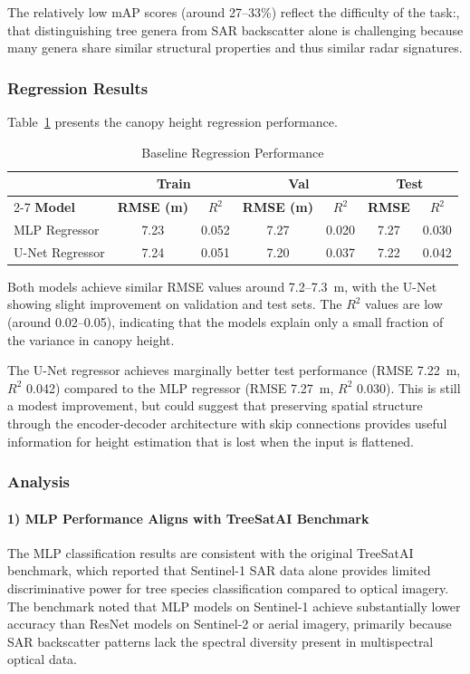 The relatively low mAP scores (around 27--33\%) reflect the difficulty of the task:, that distinguishing tree genera from SAR backscatter alone is challenging because many genera share similar structural properties and thus similar radar signatures.

\subsubsection{Regression Results}

Table~\ref{tab:baseline_regression} presents the canopy height regression performance.

\begin{table}[htbp]
\centering
\caption{Baseline Regression Performance}
\label{tab:baseline_regression}
\begin{tabular}{l|cc|cc|cc}
\hline
 & \multicolumn{2}{c|}{\textbf{Train}} & \multicolumn{2}{c|}{\textbf{Val}} & \multicolumn{2}{c}{\textbf{Test}} \\
\cline{2-7}
\textbf{Model} & \textbf{RMSE (m)} & \textbf{$R^2$} & \textbf{RMSE (m)} & \textbf{$R^2$} & \textbf{RMSE} & \textbf{$R^2$} \\
\hline
MLP Regressor & 7.23 & 0.052 & 7.27 & 0.020 & 7.27 & 0.030 \\
U-Net Regressor & 7.24 & 0.051 & 7.20 & 0.037 & 7.22 & 0.042 \\
\hline
\end{tabular}
\end{table}

Both models achieve similar RMSE values around 7.2--7.3~m, with the U-Net showing slight improvement on validation and test sets. The $R^2$ values are low (around 0.02--0.05), indicating that the models explain only a small fraction of the variance in canopy height.

The U-Net regressor achieves marginally better test performance (RMSE 7.22~m, $R^2$ 0.042) compared to the MLP regressor (RMSE 7.27~m, $R^2$ 0.030). This is still a modest improvement, but could suggest that preserving spatial structure through the encoder-decoder architecture with skip connections provides useful information for height estimation that is lost when the input is flattened.

\subsubsection{Analysis}

\paragraph{1) MLP Performance Aligns with TreeSatAI Benchmark} The MLP classification results are consistent with the original TreeSatAI benchmark, which reported that Sentinel-1 SAR data alone provides limited discriminative power for tree species classification compared to optical imagery. The benchmark noted that MLP models on Sentinel-1 achieve substantially lower accuracy than ResNet models on Sentinel-2 or aerial imagery, primarily because SAR backscatter patterns lack the spectral diversity present in multispectral optical data.

